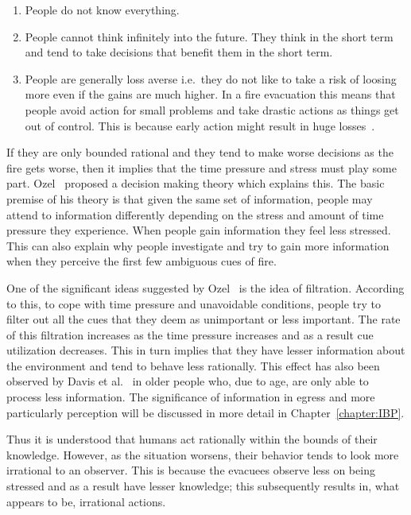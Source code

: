 \begin{enumerate}
\item People do not know everything.
\item People cannot think infinitely into the future. They think in the short term and tend to take decisions that benefit them in the short term.
\item People are generally loss averse i.e.\ they do not like to take a risk of loosing more even if the gains are much higher. In a fire evacuation this means that people avoid action for small problems and take drastic actions as things get out of control. This is because early action might result in huge losses~\cite{Graham:2000vl}.
\end{enumerate}

If they are only bounded rational and they tend to make worse decisions as the fire gets worse, then it implies that the time pressure and stress must play some part. Ozel~\cite{Ozel:2001tn} proposed a decision making theory which explains this. The basic premise of his theory is that given the same set of information, people may attend to information differently depending on the stress and amount of time pressure they experience. When people gain information they feel less stressed. This can also explain why people investigate and try to gain more information when they perceive the first few ambiguous cues of fire.

One of the significant ideas suggested by Ozel~\cite{Ozel:2001tn} is the idea of filtration. According to this, to cope with time pressure and unavoidable conditions, people try to filter out all the cues that they deem as unimportant or less important. The rate of this filtration increases as the time pressure increases and as a result cue utilization decreases. This in turn implies that they have lesser information about the environment and tend to behave less rationally. This effect has also been observed by Davis et al.~\cite{Davis01122009} in older people who, due to age, are only able to process less information. The significance of information in egress and more particularly perception will be discussed in more detail in Chapter~\ref{chapter:IBP}.

Thus it is understood that humans act rationally within the bounds of their knowledge. However, as the situation worsens, their behavior tends to look more irrational to an observer. This is because the evacuees observe less on being stressed and as a result have lesser knowledge; this subsequently results in, what appears to be, irrational actions.

